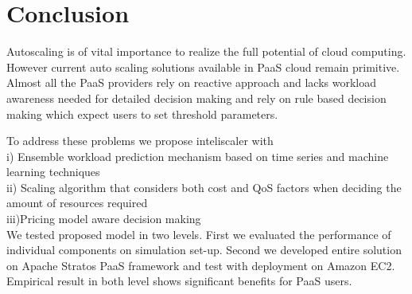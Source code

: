 \section{Conclusion}

Autoscaling is of vital importance to realize the full potential of cloud computing. However current auto scaling solutions available in PaaS cloud remain primitive. Almost all the PaaS providers rely on reactive approach and lacks workload awareness needed for detailed decision making and rely on rule based decision making which expect users to set threshold parameters. 

To address these problems we propose inteliscaler with\\
i)  Ensemble workload prediction mechanism based on time series and machine learning techniques \\ 
ii) Scaling algorithm that considers both cost and QoS factors when deciding the amount of resources required\\
iii)Pricing model aware decision making\\

We tested proposed model in two levels. First we evaluated the performance of individual components on simulation set-up. Second we developed entire solution on Apache Stratos PaaS framework and test with deployment on Amazon EC2. Empirical result in both level shows significant benefits for PaaS users.



